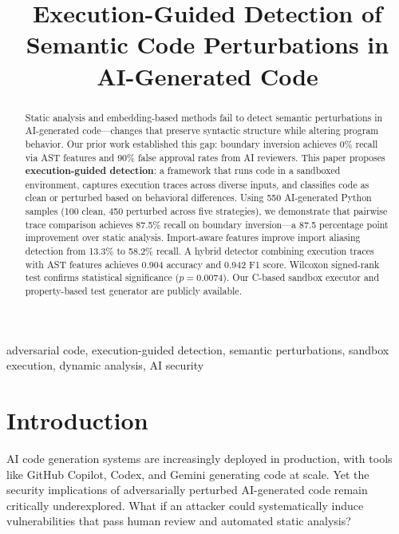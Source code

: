\documentclass[conference]{IEEEtran}
\begin{document}
\title{Execution-Guided Detection of Semantic Code Perturbations in AI-Generated Code}

\author{
}

\maketitle

\begin{abstract}
Static analysis and embedding-based methods fail to detect semantic perturbations in AI-generated code---changes that preserve syntactic structure while altering program behavior. Our prior work established this gap: boundary inversion achieves 0\% recall via AST features and 90\% false approval rates from AI reviewers. This paper proposes \textbf{execution-guided detection}: a framework that runs code in a sandboxed environment, captures execution traces across diverse inputs, and classifies code as clean or perturbed based on behavioral differences. Using 550 AI-generated Python samples (100 clean, 450 perturbed across five strategies), we demonstrate that pairwise trace comparison achieves 87.5\% recall on boundary inversion---a 87.5 percentage point improvement over static analysis. Import-aware features improve import aliasing detection from 13.3\% to 58.2\% recall. A hybrid detector combining execution traces with AST features achieves 0.904 accuracy and 0.942 F1 score. Wilcoxon signed-rank test confirms statistical significance ($p = 0.0074$). Our C-based sandbox executor and property-based test generator are publicly available.
\end{abstract}

\begin{IEEEkeywords}
adversarial code, execution-guided detection, semantic perturbations, sandbox execution, dynamic analysis, AI security
\end{IEEEkeywords}

\section{Introduction}
\label{sec:intro}

AI code generation systems are increasingly deployed in production, with tools like GitHub Copilot, Codex, and Gemini generating code at scale. Yet the security implications of adversarially perturbed AI-generated code remain critically underexplored. What if an attacker could systematically induce vulnerabilities that pass human review and automated static analysis?
\end{document}
